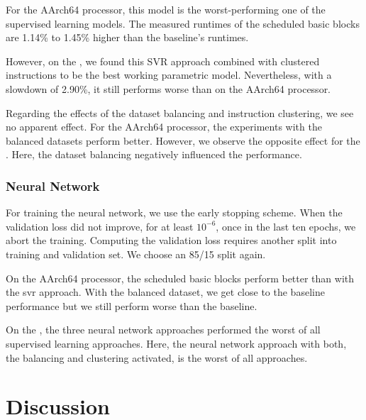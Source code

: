 For the AArch64 processor, this model is the worst-performing one of the supervised learning models.
The measured runtimes of the scheduled basic blocks are 1.14\% to 1.45\% higher than the baseline's runtimes.

However, on the \aurora, we found this SVR approach combined with clustered instructions to be the best working parametric model.
Nevertheless, with a slowdown of 2.90\%, it still performs worse than on the AArch64 processor.

Regarding the effects of the dataset balancing and instruction clustering, we see no apparent effect.
For the AArch64 processor, the experiments with the balanced datasets perform better.
However, we observe the opposite effect for the \aurora.
Here, the dataset balancing negatively influenced the performance.

\subsubsection{Neural Network}
\label{sec:eval:nn}
For training the neural network, we use the early stopping scheme.
When the validation loss did not improve, for at least $10^{-6}$, once in the last ten epochs, we abort the training.
Computing the validation loss requires another split into training and validation set. 
We choose an 85/15 split again.

On the AArch64 processor, the scheduled basic blocks perform better than with the \ac{svr} approach.
With the balanced dataset, we get close to the baseline performance but we still perform worse than the baseline.

On the \aurora, the three neural network approaches performed the worst of all supervised learning approaches.
Here, the neural network approach with both, the balancing and clustering activated, is the worst of all approaches.


\section{Discussion}
\label{sec:eval:discussion}
